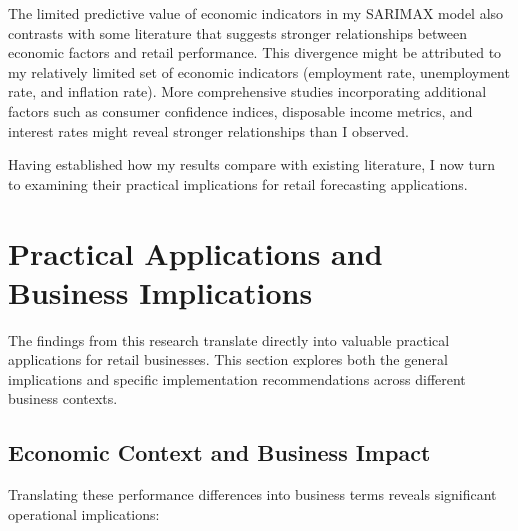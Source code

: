 \documentclass[12pt,a4paper]{report}
\begin{document}
The limited predictive value of economic indicators in my SARIMAX model also contrasts with some literature that suggests stronger relationships between economic factors and retail performance. This divergence might be attributed to my relatively limited set of economic indicators (employment rate, unemployment rate, and inflation rate). More comprehensive studies incorporating additional factors such as consumer confidence indices, disposable income metrics, and interest rates might reveal stronger relationships than I observed.

Having established how my results compare with existing literature, I now turn to examining their practical implications for retail forecasting applications.

\section{Practical Applications and Business Implications}

The findings from this research translate directly into valuable practical applications for retail businesses. This section explores both the general implications and specific implementation recommendations across different business contexts.

\subsection{Economic Context and Business Impact}
Translating these performance differences into business terms reveals significant operational implications:
\end{document}
